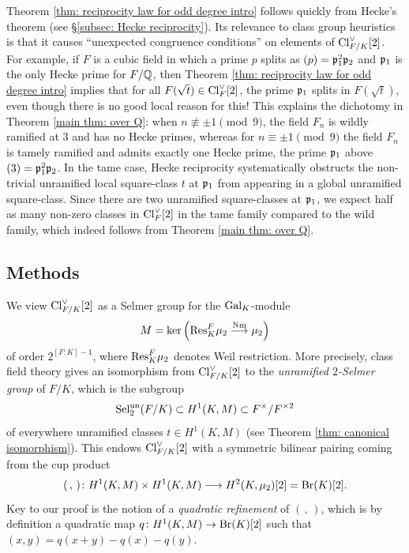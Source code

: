 \documentclass[11pt,a4paper]{amsart}
\def\Q{{\rm \mathbb{Q}}}
\def\p{{\rm \mathfrak{p}}}
\def\Nm{{\rm Nm}}
\def\Br{{\rm Br}}
\def\Cl{{\rm Cl}}
\def\Res{{\rm Res}}
\def\Gal{{\rm Gal}}
\def\Sel{{\rm Sel}}
\numberwithin{equation}{section}
\begin{document}
Theorem \ref{thm: reciprocity law for odd degree intro} follows quickly from Hecke's theorem (see \S\ref{subsec: Hecke reciprocity}). Its relevance to class group heuristics is that it causes ``unexpected congruence conditions'' on elements of $\Cl_{F/K}^\vee[2]$. For example, if $F$ is a cubic field in which a prime $p$ splits as  $(p) = \p_1^2\p_2$ and $\p_1$ is the only Hecke  prime for $F/\Q$, then Theorem \ref{thm: reciprocity law for odd degree intro} implies that for all $F(\sqrt{t}) \in \Cl_F^\vee[2]$, the prime $\p_1$ splits in $F(\sqrt{t})$,  even though there is no good local reason for this! 
This explains the dichotomy in Theorem \ref{main thm: over Q}: when $n \not\equiv \pm1 \pmod{9}$, the field $F_n$ is wildly ramified at $3$ and has no Hecke primes, whereas for $n \equiv \pm 1\pmod{9}$ the field $F_n$ is tamely ramified and admits exactly one Hecke prime, the prime $\p_1$ above $(3) = \p_1^2\p_2$. In the tame case, Hecke reciprocity systematically obstructs the non-trivial unramified local square-class $t$ at $\p_1$ from appearing in a global unramified square-class. Since there are two unramified square-classes at $\p_1$, we expect half as many non-zero classes in $\Cl_F^\vee[2]$ in the tame family compared to the wild family, which indeed follows from Theorem \ref{main thm: over Q}. 


\subsection{Methods}


We view $\Cl_{F/K}^\vee[2]$ as a Selmer group for the $\Gal_K$-module
\[M = \ker\left(\Res^F_K \mu_2 \stackrel{\Nm}{\longrightarrow} \mu_2\right)\]
of order $2^{[F \colon K]-1}$, where $\Res^F_K \mu_2$ denotes Weil restriction.  More precisely, class field theory gives an isomorphism from $\Cl_{F/K}^\vee[2]$ to the {\it unramified $2$-Selmer group} of $F/K$, which is the subgroup
\[\Sel^\mathrm{un}_2(F/K) \subset H^1(K, M) \subset F^\times/F^{\times2}\]
of everywhere unramified classes $t \in H^1(K, M)$ (see Theorem \ref{thm: canonical isomorphism}).
This endows $\Cl_{F/K}^\vee[2]$ with a symmetric bilinear pairing coming from the cup product
\[(\, , \, )\colon H^1(K, M) \times H^1(K, M) \longrightarrow H^2(K, \mu_2)[2] = \Br(K)[2].\]
Key to our proof is the notion of a {\it quadratic refinement} of $(\, , \, )$, which is by definition a quadratic map  $q \colon H^1(K,M) \to \Br(K)[2]$ such that $(x,y) = q(x + y) - q(x) - q(y)$. 
\end{document}
